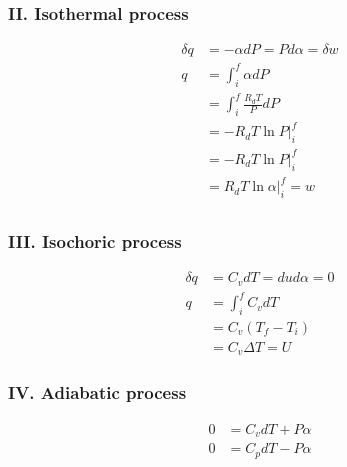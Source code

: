 \documentclass[fleqn,10pt]{SelfArx} %
\begin{document}
\subsubsection*{II. Isothermal process}
\begin{align}
    \delta q &= -\alpha dP = Pd\alpha = \delta w \\
    q &= \int^f_i \alpha dP \\
      &= \int^f_i \frac{R_d T}{P} dP \\
      &= -R_d T \ln P|^f_i \\
      &= -R_d T \ln P|^f_i \\
      &= R_d T \ln \alpha|^f_i = w \\
\end{align}

\subsubsection*{III. Isochoric process}
\begin{align}
    \delta q &= C_v dT =du  d\alpha = 0 \\
    q &= \int^f_i C_v dT \\
      &= C_v (T_f -T_i) \\
      &= C_v \Delta T = U
\end{align}

\subsubsection*{IV. Adiabatic process}
\begin{align}
    0 &= C_v dT + P\alpha \\
    0 &= C_p dT - P\alpha
\end{align}
\end{document}
